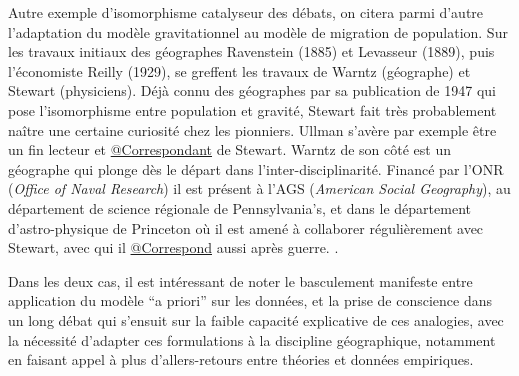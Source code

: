 Autre exemple d'isomorphisme catalyseur des débats, on citera parmi d'autre l'adaptation du modèle gravitationnel au modèle de migration de population. Sur les travaux initiaux des géographes Ravenstein (1885) et Levasseur (1889), puis l'économiste Reilly (1929), se greffent les travaux de Warntz (géographe) et Stewart (physiciens). Déjà connu des géographes par sa publication de 1947 qui pose l'isomorphisme entre population et gravité, Stewart fait très probablement naître une certaine curiosité chez les pionniers. Ullman s'avère par exemple être un fin lecteur \autocite[61]{Glick1988} et \href{http://nwda.orbiscascade.org/ark:/80444/xv01385}{@Correspondant} de Stewart. Warntz de son côté est un géographe qui plonge dès le départ dans l'inter-disciplinarité. Financé par l'ONR (\textit{Office of Naval Research}) il est présent à l'AGS (\textit{American Social Geography}), au département de science régionale de Pennsylvania's, et dans le département d'astro-physique de Princeton où il est amené à collaborer régulièrement avec Stewart, avec qui il \href{http://rmc.library.cornell.edu/EAD/htmldocs/RMM04392.html}{@Correspond} aussi après guerre. \autocite{Barnes2006a}.

Dans les deux cas, il est intéressant de noter le basculement manifeste entre application du modèle \foreignquote{latin}{a priori} sur les données, et la prise de conscience dans un long débat qui s'ensuit sur la faible capacité explicative de ces analogies, avec la nécessité d'adapter ces formulations à la discipline géographique, notamment en faisant appel à plus d'allers-retours entre théories et données empiriques.


